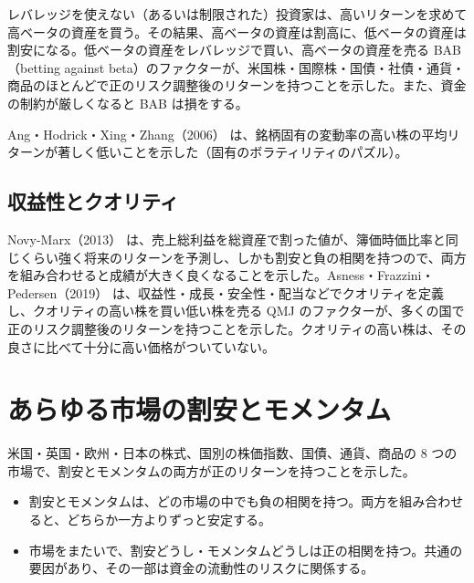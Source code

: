 \begin{paperbox}
レバレッジを使えない（あるいは制限された）投資家は、高いリターンを求めて高ベータの資産を買う。その結果、高ベータの資産は割高に、低ベータの資産は割安になる。低ベータの資産をレバレッジで買い、高ベータの資産を売る BAB（betting against beta）のファクターが、米国株・国際株・国債・社債・通貨・商品のほとんどで正のリスク調整後のリターンを持つことを示した。また、資金の制約が厳しくなると BAB は損をする。
\end{paperbox}

Ang・Hodrick・Xing・Zhang（2006）\cite{ahxz2006} は、銘柄固有の変動率の高い株の平均リターンが著しく低いことを示した（固有のボラティリティのパズル）。

\subsection{収益性とクオリティ}

Novy-Marx（2013）\cite{novymarx2013} は、売上総利益を総資産で割った値が、簿価時価比率と同じくらい強く将来のリターンを予測し、しかも割安と負の相関を持つので、両方を組み合わせると成績が大きく良くなることを示した。Asness・Frazzini・Pedersen（2019）\cite{qmj2019} は、収益性・成長・安全性・配当などでクオリティを定義し、クオリティの高い株を買い低い株を売る QMJ のファクターが、多くの国で正のリスク調整後のリターンを持つことを示した。クオリティの高い株は、その良さに比べて十分に高い価格がついていない。

\section{あらゆる市場の割安とモメンタム}
\label{sec:amp}

\begin{paperbox}
米国・英国・欧州・日本の株式、国別の株価指数、国債、通貨、商品の 8 つの市場で、割安とモメンタムの両方が正のリターンを持つことを示した。
\begin{itemize}
\item 割安とモメンタムは、どの市場の中でも負の相関を持つ。両方を組み合わせると、どちらか一方よりずっと安定する。
\item 市場をまたいで、割安どうし・モメンタムどうしは正の相関を持つ。共通の要因があり、その一部は資金の流動性のリスクに関係する。
\end{itemize}
\end{paperbox}

